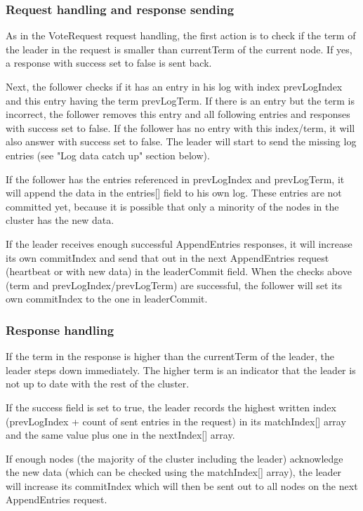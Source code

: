 \subsubsection*{Request handling and response sending}

As in the VoteRequest request handling, the first action is to check if the term of the
leader in the request is smaller than currentTerm of the current node. If yes, a response with success
set to false is sent back.

Next, the follower checks if it has an entry in his log with index prevLogIndex and this entry having the term prevLogTerm.
If there is an entry but the term is incorrect, the follower removes this entry and all following entries and responses
with success set to false. If the follower has no entry with this index/term, it will also answer with success set to false.
The leader will start to send the missing log entries (see "Log data catch up" section below).

If the follower has the entries referenced in prevLogIndex and prevLogTerm, it will append the data in the entries[] field to his
own log. These entries are not committed yet, because it is possible that only a minority of the nodes in the cluster has the new data.

If the leader receives enough successful AppendEntries responses, it will increase its own commitIndex and send that out in the next AppendEntries request (heartbeat or with new data) in the leaderCommit field. When the checks above (term and prevLogIndex/prevLogTerm) are successful, the follower will set its own commitIndex to the one in leaderCommit.

\subsubsection*{Response handling}

If the term in the response is higher than the currentTerm of the leader, the leader steps down immediately. The higher term
is an indicator that the leader is not up to date with the rest of the cluster.

If the success field is set to true, the leader records the highest written index (prevLogIndex + count of sent entries in the request) in its matchIndex[] array and
the same value plus one in the nextIndex[] array.

If enough nodes (the majority of the cluster including the leader) acknowledge the new data (which can be checked using the matchIndex[] array), the leader will increase its commitIndex which will then be sent out to all nodes on the next AppendEntries request.

